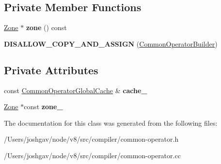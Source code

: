 \subsection*{Private Member Functions}
\begin{DoxyCompactItemize}
\item 
\hyperlink{classv8_1_1internal_1_1_zone}{Zone} $\ast$ {\bfseries zone} () const \hypertarget{classv8_1_1internal_1_1compiler_1_1_common_operator_builder_a9d826f2c0ca9519b817385ffd99d93f2}{}\label{classv8_1_1internal_1_1compiler_1_1_common_operator_builder_a9d826f2c0ca9519b817385ffd99d93f2}

\item 
{\bfseries D\+I\+S\+A\+L\+L\+O\+W\+\_\+\+C\+O\+P\+Y\+\_\+\+A\+N\+D\+\_\+\+A\+S\+S\+I\+GN} (\hyperlink{classv8_1_1internal_1_1compiler_1_1_common_operator_builder}{Common\+Operator\+Builder})\hypertarget{classv8_1_1internal_1_1compiler_1_1_common_operator_builder_a5b12ef1d6e9710ec958abc7e28b3b410}{}\label{classv8_1_1internal_1_1compiler_1_1_common_operator_builder_a5b12ef1d6e9710ec958abc7e28b3b410}

\end{DoxyCompactItemize}
\subsection*{Private Attributes}
\begin{DoxyCompactItemize}
\item 
const \hyperlink{structv8_1_1internal_1_1compiler_1_1_common_operator_global_cache}{Common\+Operator\+Global\+Cache} \& {\bfseries cache\+\_\+}\hypertarget{classv8_1_1internal_1_1compiler_1_1_common_operator_builder_ab36d4c761d48fda7c33e19aa440e2282}{}\label{classv8_1_1internal_1_1compiler_1_1_common_operator_builder_ab36d4c761d48fda7c33e19aa440e2282}

\item 
\hyperlink{classv8_1_1internal_1_1_zone}{Zone} $\ast$const {\bfseries zone\+\_\+}\hypertarget{classv8_1_1internal_1_1compiler_1_1_common_operator_builder_a349bc8851c91407c33944d02a2389712}{}\label{classv8_1_1internal_1_1compiler_1_1_common_operator_builder_a349bc8851c91407c33944d02a2389712}

\end{DoxyCompactItemize}


The documentation for this class was generated from the following files\+:\begin{DoxyCompactItemize}
\item 
/\+Users/joshgav/node/v8/src/compiler/common-\/operator.\+h\item 
/\+Users/joshgav/node/v8/src/compiler/common-\/operator.\+cc\end{DoxyCompactItemize}

